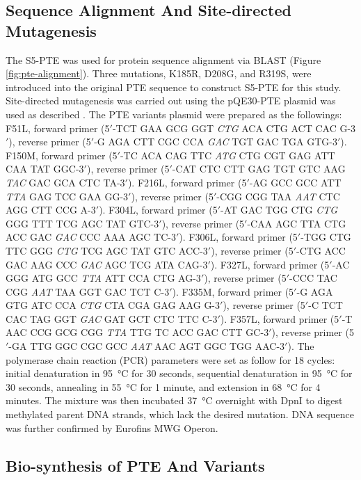 \begin{refsection}
\subsection{Sequence Alignment And Site-directed Mutagenesis}

The S5-PTE\cite{Griffiths2003} was used for protein sequence alignment via
BLAST (Figure \ref{fig:pte-alignment}). Three mutations, K185R, D208G, and
R319S, were introduced into the original PTE sequence to construct S5-PTE for
this study. Site-directed mutagenesis was carried out using the pQE30-PTE
plasmid was used as described \cite{Yang2014a,Baker2011b}. The PTE variants
plasmid were prepared as the followings: F51L, forward primer
(5$'$-TCT GAA GCG GGT \emph{CTG} ACA CTG ACT CAC G-3$'$), reverse primer
(5$'$-G AGA CTT CGC CCA \emph{GAC} TGT GAC TGA GTG-3$'$). F150M, forward primer
(5$'$-TC ACA CAG TTC \emph{ATG} CTG CGT GAG ATT CAA TAT GGC-3$'$), reverse primer
(5$'$-CAT CTC CTT GAG TGT GTC AAG \emph{TAC} GAC GCA CTC TA-3$'$). F216L, forward primer
(5$'$-AG GCC GCC ATT \emph{TTA} GAG TCC GAA GG-3$'$), reverse primer
(5$'$-CGG CGG TAA \emph{AAT} CTC AGG CTT CCG A-3$'$). F304L, forward primer
(5$'$-AT GAC TGG CTG \emph{CTG} GGG TTT TCG AGC TAT GTC-3$'$), reverse primer
(5$'$-CAA AGC TTA CTG ACC GAC \emph{GAC} CCC AAA AGC TC-3$'$). F306L, forward primer
(5$'$-TGG CTG TTC GGG \emph{CTG} TCG AGC TAT GTC ACC-3$'$), reverse primer
(5$'$-CTG ACC GAC AAG CCC \emph{GAC} AGC TCG ATA CAG-3$'$). F327L, forward primer
(5$'$-AC GGG ATG GCC \emph{TTA} ATT CCA CTG AG-3$'$), reverse primer
(5$'$-CCC TAC CGG \emph{AAT} TAA GGT GAC TCT C-3$'$). F335M, forward primer
(5$'$-G AGA GTG ATC CCA \emph{CTG} CTA CGA GAG AAG G-3$'$), reverse primer
(5$'$-C TCT CAC TAG GGT \emph{GAC} GAT GCT CTC TTC C-3$'$). F357L, forward primer
(5$'$-T AAC CCG GCG CGG \emph{TTA} TTG TC ACC GAC CTT GC-3$'$), reverse primer
(5$'$-GA TTG GGC CGC GCC \emph{AAT} AAC AGT GGC TGG AAC-3$'$). The polymerase
chain reaction (PCR) parameters were set as follow for 18 cycles: initial
denaturation in \SI{95}{\celsius} for 30 seconds, sequential denaturation in
\SI{95}{\celsius} for 30 seconds, annealing in \SI{55}{\celsius} for 1 minute,
and extension in \SI{68}{\celsius} for 4 minutes. The mixture was then
incubated \SI{37}{\celsius} overnight with DpnI to digest methylated parent DNA
strands, which lack the desired mutation. DNA sequence was further confirmed by
Eurofins MWG Operon.

\subsection{Bio-synthesis of PTE And Variants}


\end{refsection}
